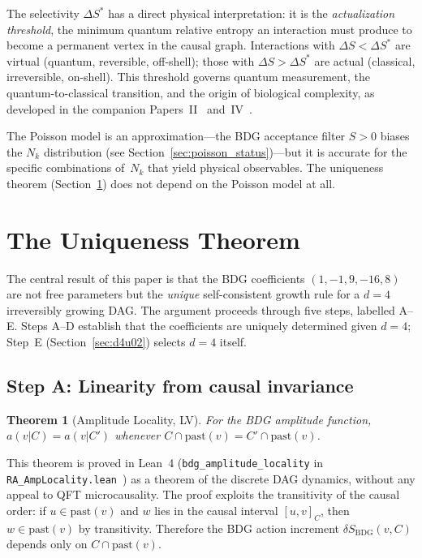 \documentclass[12pt,a4paper]{article}
\newtheorem{theorem}{Theorem}[section]
\begin{document}
The selectivity $\Delta S^*$ has a direct physical interpretation: it is the \emph{actualization threshold}, the minimum quantum relative entropy an interaction must produce to become a permanent vertex in the causal graph. Interactions with $\Delta S < \Delta S^*$ are virtual (quantum, reversible, off-shell); those with $\Delta S > \Delta S^*$ are actual (classical, irreversible, on-shell). This threshold governs quantum measurement, the quantum-to-classical transition, and the origin of biological complexity, as developed in the companion Papers~II~\cite{P2} and~IV~\cite{P4}.

The Poisson model is an approximation---the BDG acceptance filter $S>0$ biases the $N_k$ distribution (see Section~\ref{sec:poisson_status})---but it is accurate for the specific combinations of~$N_k$ that yield physical observables. The uniqueness theorem (Section~\ref{sec:uniqueness}) does not depend on the Poisson model at all.

\section{The Uniqueness Theorem}\label{sec:uniqueness}

The central result of this paper is that the BDG coefficients $(1,-1,9,-16,8)$ are not free parameters but the \emph{unique} self-consistent growth rule for a $d=4$ irreversibly growing DAG. The argument proceeds through five steps, labelled A--E. Steps A--D establish that the coefficients are uniquely determined given $d=4$; Step~E (Section~\ref{sec:d4u02}) selects $d=4$ itself.

\subsection{Step A: Linearity from causal invariance}\label{sec:linearity}

\begin{theorem}[Amplitude Locality, LV]\label{thm:amploc}
For the BDG amplitude function, $a(v|C) = a(v|C')$ whenever $C \cap \mathrm{past}(v) = C' \cap \mathrm{past}(v)$.
\end{theorem}

This theorem is proved in Lean~4 (\texttt{bdg\_amplitude\_locality} in \texttt{RA\_AmpLocality.lean}~\cite{AmpLocLean}) as a theorem of the discrete DAG dynamics, without any appeal to QFT microcausality. The proof exploits the transitivity of the causal order: if $u \in \mathrm{past}(v)$ and $w$ lies in the causal interval $[u,v]_C$, then $w \in \mathrm{past}(v)$ by transitivity. Therefore the BDG action increment $\delta S_{\mathrm{BDG}}(v,C)$ depends only on $C \cap \mathrm{past}(v)$.
\end{document}
